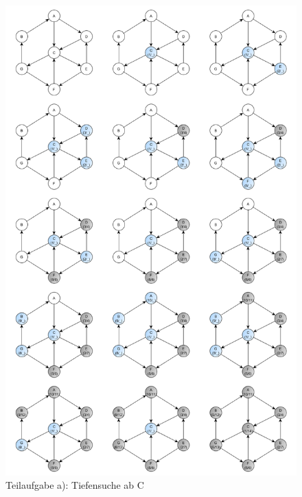 \documentclass[12pt]{scrartcl}
\begin{document}
\begin{figure}[h!]
\begin{center}
\includegraphics[scale=0.35]{CTiefensucheComplete.png}
\caption{Teilaufgabe a): Tiefensuche ab C}
\end{center}
\end{figure}

\newpage
\end{document}
